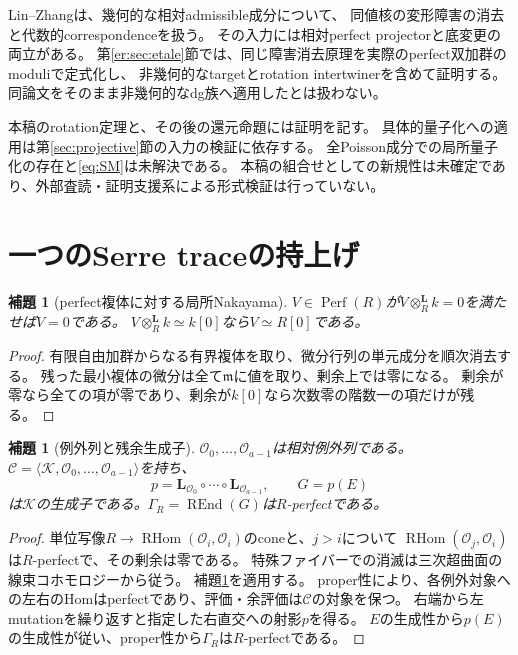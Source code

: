 \documentclass[a4paper,10pt]{ltjsarticle}
\newtheorem{lemma}[theorem]{補題}
\theoremstyle{definition}
\theoremstyle{remark}
\newcommand{\Perf}{\operatorname{Perf}}
\newcommand{\RHom}{\operatorname{RHom}}
\newcommand{\REnd}{\operatorname{REnd}}
\newcommand{\OO}{\mathcal O}
\newcommand{\cC}{\mathcal C}
\newcommand{\cK}{\mathcal K}
\newcommand{\otL}{\otimes^{\mathbf L}}
\newcommand{\LL}{\mathbf L}
\begin{document}
Lin--Zhang\cite[\S2.1, Theorem 2.2, Proposition 2.4]{ERLinZhang}は、幾何的な相対admissible成分について、
同値核の変形障害の消去と代数的correspondenceを扱う。
その入力には相対perfect projectorと底変更の両立がある。
第\ref{er:sec:etale}節では、同じ障害消去原理を実際のperfect双加群のmoduliで定式化し、
非幾何的なtargetとrotation intertwinerを含めて証明する。
同論文をそのまま非幾何的なdg族へ適用したとは扱わない。

本稿のrotation定理と、その後の還元命題には証明を記す。
具体的量子化への適用は第\ref{sec:projective}節の入力の検証に依存する。
全Poisson成分での局所量子化の存在と\eqref{eq:SM}は未解決である。
本稿の組合せとしての新規性は未確定であり、外部査読・証明支援系による形式検証は行っていない。

\section{一つのSerre traceの持上げ}\label{sec:trace}
\begin{lemma}[perfect複体に対する局所Nakayama]\label{lem:nakayama}
$V\in\Perf(R)$が$V\otL_Rk=0$を満たせば$V=0$である。
$V\otL_Rk\simeq k[0]$なら$V\simeq R[0]$である。
\end{lemma}
\begin{proof}
有限自由加群からなる有界複体を取り、微分行列の単元成分を順次消去する。
残った最小複体の微分は全て$\mathfrak m$に値を取り、剰余上では零になる。
剰余が零なら全ての項が零であり、剰余が$k[0]$なら次数零の階数一の項だけが残る。
\end{proof}

\begin{lemma}[例外列と残余生成子]\label{lem:exceptional}
$\OO_0,\ldots,\OO_{a-1}$は相対例外列である。
$\cC=\langle\cK,\OO_0,\ldots,\OO_{a-1}\rangle$を持ち、
\[
 p=\LL_{\OO_0}\circ\cdots\circ\LL_{\OO_{a-1}},\qquad G=p(E)
\]
は$\cK$の生成子である。$\Gamma_R=\REnd(G)$は$R$-perfectである。
\end{lemma}
\begin{proof}
単位写像$R\to\RHom(\OO_i,\OO_i)$のconeと、$j>i$について
$\RHom(\OO_j,\OO_i)$は$R$-perfectで、その剰余は零である。
特殊ファイバーでの消滅は三次超曲面の線束コホモロジーから従う。
補題\ref{lem:nakayama}を適用する。
proper性により、各例外対象への左右のHomはperfectであり、評価・余評価は$\cC$の対象を保つ。
右端から左mutationを繰り返すと指定した右直交への射影$p$を得る。
$E$の生成性から$p(E)$の生成性が従い、proper性から$\Gamma_R$は$R$-perfectである。
\end{proof}
\end{document}

